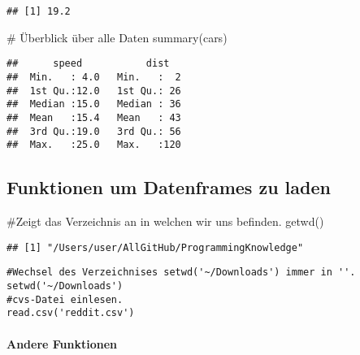 \documentclass[]{article}
\newenvironment{Shaded}{\begin{snugshade}}{\end{snugshade}}
\newcommand{\KeywordTok}[1]{\textcolor[rgb]{0.94,0.87,0.69}{{#1}}}
\newcommand{\CommentTok}[1]{\textcolor[rgb]{0.50,0.62,0.50}{{#1}}}
\newcommand{\NormalTok}[1]{\textcolor[rgb]{0.80,0.80,0.80}{{#1}}}
\begin{document}
\begin{Shaded}
\end{Shaded}

\begin{verbatim}
## [1] 19.2
\end{verbatim}

\begin{Shaded}
\begin{Highlighting}[]
\CommentTok{# Überblick über alle Daten}
\KeywordTok{summary}\NormalTok{(cars)}
\end{Highlighting}
\end{Shaded}

\begin{verbatim}
##      speed           dist    
##  Min.   : 4.0   Min.   :  2  
##  1st Qu.:12.0   1st Qu.: 26  
##  Median :15.0   Median : 36  
##  Mean   :15.4   Mean   : 43  
##  3rd Qu.:19.0   3rd Qu.: 56  
##  Max.   :25.0   Max.   :120
\end{verbatim}

\subsection{Funktionen um Datenframes zu
laden}\label{funktionen-um-datenframes-zu-laden}

\begin{Shaded}
\begin{Highlighting}[]
\CommentTok{#Zeigt das Verzeichnis an in welchen wir uns befinden.}
\KeywordTok{getwd}\NormalTok{() }
\end{Highlighting}
\end{Shaded}

\begin{verbatim}
## [1] "/Users/user/AllGitHub/ProgrammingKnowledge"
\end{verbatim}

\begin{verbatim}
#Wechsel des Verzeichnises setwd('~/Downloads') immer in ''.
setwd('~/Downloads') 
#cvs-Datei einlesen.
read.csv('reddit.csv')
\end{verbatim}

\paragraph{Andere Funktionen}\label{andere-funktionen}
\end{document}
